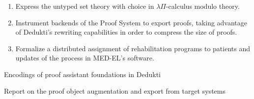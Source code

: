 \begin{workpackage}[id=theories,wphases=0-48,type=RTD,
  short=Theories,%
  title= Theories,
  lead=Inn,
  InnRM=6,
  BiaRM=48,
  LmuRM=12,
  SacRM=36,
  InrRM=24,
  ]
\begin{tasklist}
\begin{task}[id=tla,
  title=Express the theory of \tlaplus in Dedukti,
  lead=Inr,   %
  InrRM=0,   %
  MedRM=0    %
  ]
  \begin{enumerate}
  \item Express the untyped \tlaplus set theory with choice in
    $\lambda\Pi$-calculus modulo theory.
  \item Instrument backends of the \tlaplus Proof System to export proofs,
    taking advantage of Dedukti's rewriting capabilities in order to compress
    the size of proofs.
  \item Formalize a distributed assignment of rehabilitation programs to
    patients and updates of the process in MED-EL's software.
  \end{enumerate}
\end{task}

\end{tasklist}

\begin{wpdelivs}
  \begin{wpdeliv}[due=30,id=wp2encodings,dissem=PU,nature=P,lead=Inr]
      {Encodings of proof assistant foundations in Dedukti}
  \end{wpdeliv}
  \begin{wpdeliv}[due=36,id=wp2proofobj,dissem=PU,nature=R,lead=Bia]
      {Report on the proof object augmentation and export from target systems}
  \end{wpdeliv}
\end{wpdelivs}
\end{workpackage}


